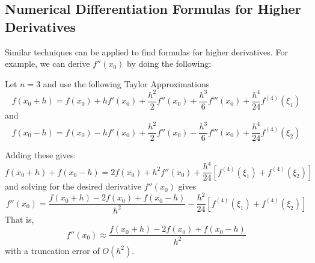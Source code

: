 \documentclass [titlepage,12pt,letter] {article}
\begin{document}
\subsection{Numerical Differentiation Formulas for Higher Derivatives}

Similar techniques can be applied to find formulas for higher derivatives. For example, we can derive $f''(x_0)$ by doing the following:

Let $n=3$ and use the following Taylor Approximations
\begin{equation*}
f(x_0+h) = f(x_0) + hf'(x_0) + \frac{h^2}{2}f''(x_0) + \frac{h^3}{6}f'''(x_0) + \frac{h^4}{24}f^{(4)}(\xi_1)
\end{equation*}
and
\begin{equation*}
f(x_0-h) = f(x_0) - hf'(x_0) + \frac{h^2}{2}f''(x_0) - \frac{h^3}{6}f'''(x_0) + \frac{h^4}{24}f^{(4)}(\xi_2)
\end{equation*}

Adding these gives:
\begin{equation*}
f(x_0+h)+ f(x_0-h)= 2f(x_0) + h^2f''(x_0) +  \frac{h^4}{24}\left[f^{(4)}(\xi_1)+f^{(4)}(\xi_2)\right]
\end{equation*}
and solving for the desired derivative $f''(x_0)$ gives
\begin{equation*}
f''(x_0)= \frac{f(x_0+h)-2f(x_0)+f(x_0-h)}{h^2} - \frac{h^2}{24}\left[f^{(4)}(\xi_1)+f^{(4)}(\xi_2)\right]
\end{equation*}
That is, 
\begin{equation*}
f''(x_0) \approx \frac{f(x_0+h)-2f(x_0)+f(x_0-h)}{h^2}
\end{equation*}
with a truncation error of $O(h^2)$.
\end{document}
